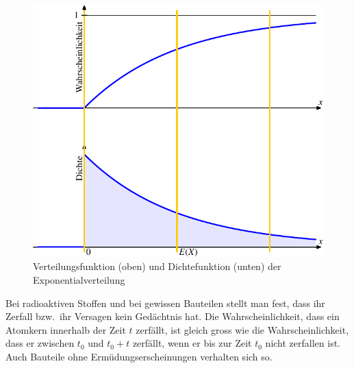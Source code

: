\begin{figure}
\begin{center}
\includegraphics[width=0.8\hsize]{images/verteilungsfunktion-8}
\end{center}
\caption{Verteilungsfunktion (oben) und Dichtefunktion (unten) der
Exponentialverteilung
\label{bildexponentialverteilung}}
\end{figure}
Bei radioaktiven Stoffen und bei gewissen Bauteilen stellt man fest,
dass ihr Zerfall bzw.~ihr Versagen kein Gedächtnis hat.
Die Wahrscheinlichkeit, dass ein Atomkern innerhalb der Zeit $t$ zerfällt,
ist gleich gross wie die Wahrscheinlichkeit, dass er zwischen $t_0$
und $t_0+t$ zerfällt, wenn er bis zur Zeit $t_0$ nicht zerfallen ist.
Auch Bauteile ohne Ermüdungserscheinungen verhalten sich so.

